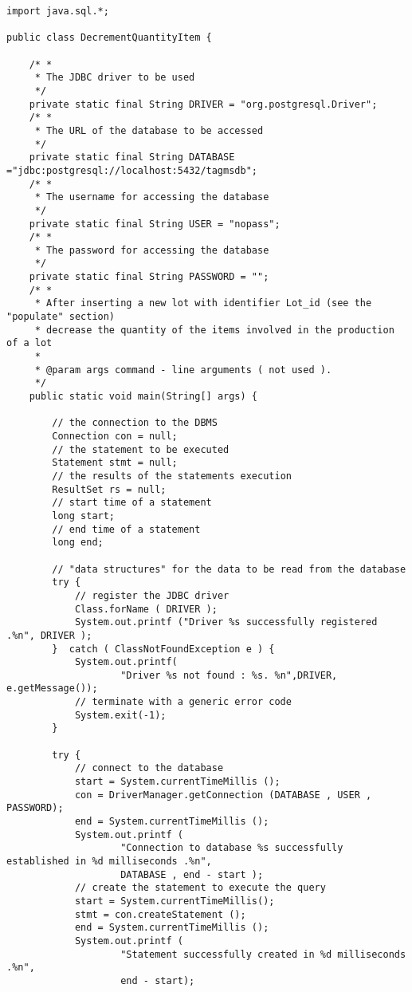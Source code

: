 \begin{lstlisting}
import java.sql.*;

public class DecrementQuantityItem {

    /* *
     * The JDBC driver to be used
     */
    private static final String DRIVER = "org.postgresql.Driver";
    /* *
     * The URL of the database to be accessed
     */
    private static final String DATABASE ="jdbc:postgresql://localhost:5432/tagmsdb";
    /* *
     * The username for accessing the database
     */
    private static final String USER = "nopass";
    /* *
     * The password for accessing the database
     */
    private static final String PASSWORD = "";
    /* *
     * After inserting a new lot with identifier Lot_id (see the "populate" section)
     * decrease the quantity of the items involved in the production of a lot
     *
     * @param args command - line arguments ( not used ).
     */
    public static void main(String[] args) {

        // the connection to the DBMS
        Connection con = null;
        // the statement to be executed
        Statement stmt = null;
        // the results of the statements execution
        ResultSet rs = null;
        // start time of a statement
        long start;
        // end time of a statement
        long end;

        // "data structures" for the data to be read from the database
        try {
            // register the JDBC driver
            Class.forName ( DRIVER );
            System.out.printf ("Driver %s successfully registered .%n", DRIVER );
        }  catch ( ClassNotFoundException e ) {
            System.out.printf(
                    "Driver %s not found : %s. %n",DRIVER, e.getMessage());
            // terminate with a generic error code
            System.exit(-1);
        }

        try {
            // connect to the database
            start = System.currentTimeMillis ();
            con = DriverManager.getConnection (DATABASE , USER , PASSWORD);
            end = System.currentTimeMillis ();
            System.out.printf (
                    "Connection to database %s successfully established in %d milliseconds .%n",
                    DATABASE , end - start );
            // create the statement to execute the query
            start = System.currentTimeMillis();
            stmt = con.createStatement ();
            end = System.currentTimeMillis ();
            System.out.printf (
                    "Statement successfully created in %d milliseconds .%n",
                    end - start);


\end{lstlisting}

